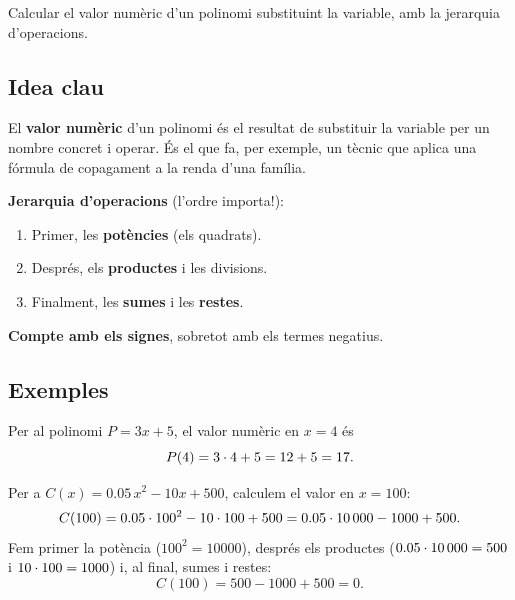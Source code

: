 %
{Calcular el valor numèric d'un polinomi substituint la variable, amb la jerarquia d'operacions.}

\subsection{Idea clau}

El \textbf{valor numèric} d'un polinomi és el resultat de substituir la variable
per un nombre concret i operar. És el que fa, per exemple, un tècnic que aplica
una fórmula de copagament a la renda d'una família.

\begin{idea}
\textbf{Jerarquia d'operacions} (l'ordre importa!):
\begin{enumerate}[leftmargin=1.6em, itemsep=2pt]
  \item Primer, les \textbf{potències} (els quadrats).
  \item Després, els \textbf{productes} i les divisions.
  \item Finalment, les \textbf{sumes} i les \textbf{restes}.
\end{enumerate}
\textbf{Compte amb els signes}, sobretot amb els termes negatius.
\end{idea}

\subsection{Exemples}

\begin{exemple}
Per al polinomi $P = 3x + 5$, el valor numèric en $x=4$ és
\[
P(4) = 3\cdot 4 + 5 = 12 + 5 = 17.
\]
\end{exemple}

\begin{exemple}
Per a $C(x) = \num{0,05}\,x^2 - 10x + 500$, calculem el valor en $x=100$:
\[
C(100) = \num{0,05}\cdot 100^2 - 10\cdot 100 + 500
       = \num{0,05}\cdot \num{10000} - \num{1000} + 500.
\]
Fem primer la potència ($100^2=\num{10000}$), després els productes
($\num{0,05}\cdot\num{10000}=500$ i $10\cdot 100=\num{1000}$) i, al final, sumes i restes:
\[
C(100) = 500 - \num{1000} + 500 = 0.
\]
\end{exemple}

